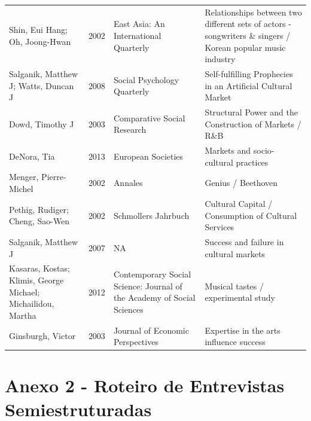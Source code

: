 \documentclass[a4paper, 12pt, openright, oneside, german, french, english, brazil]{abntex2}
\begin{document}
\begin{SingleSpace}
\begin{footnotesize}
\begin{center}
\begin{longtable}{p{4cm}lp{4cm}p{4cm}}
		Shin, Eui Hang; Oh, Joong-Hwan & 2002 & East Asia: An International Quarterly & Relationships between two different sets of actors - songwriters \& singers / Korean popular music industry\\

		Salganik, Matthew J; Watts, Duncan J & 2008 & Social Psychology Quarterly & Self-fulfilling Prophecies in an Artificial Cultural Market\\

		Dowd, Timothy J & 2003 & Comparative Social Research & Structural Power and the Construction of Markets / R\&B\\

		DeNora, Tia & 2013 & European Societies & Markets and socio-cultural practices\\

		Menger, Pierre-Michel & 2002 & Annales & Genius / Beethoven\\

		Pethig, Rudiger; Cheng, Sao-Wen & 2002 & Schmollers Jahrbuch & Cultural Capital / Consumption of Cultural Services\\

		Salganik, Matthew J & 2007 & NA & Success and failure in cultural markets\\

		Kasaras, Kostas; Klimis, George Michael; Michailidou, Martha & 2012 & Contemporary Social Science: Journal of the Academy of Social Sciences & Musical tastes / experimental study\\

		Ginsburgh, Victor & 2003 & Journal of Economic Perspectives & Expertise in the arts influence success\\



	\end{longtable}

\end{center}

\end{footnotesize}

\end{SingleSpace}



	\chapter*[Anexo 2]{Anexo 2 - Roteiro de Entrevistas Semiestruturadas}

\end{document}
